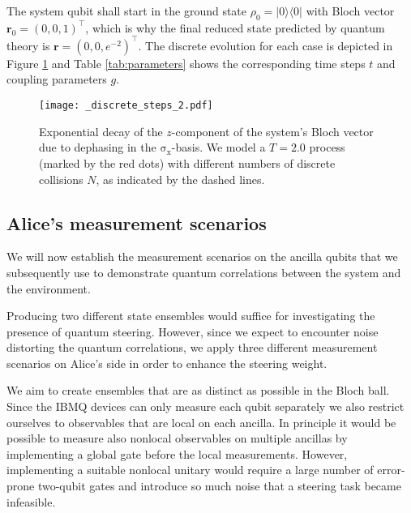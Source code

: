 \documentclass[aps,pra,twocolumn,superscriptaddress,showemail,showpacs,longbibliography]{revtex4-2}
\newcommand{\kb}[2]{|#1\rangle\langle#2|} %
\newcommand{\sigmax}{\operatorname{\sigma_x}}
\renewcommand{\vec}{\mathbf}
\begin{document}
The system qubit shall start in the ground state $\rho_0 = \kb{0}{0}$ with Bloch vector $\vec{r}_0 = (0,0,1)^\intercal$, which is why the final reduced state predicted by quantum theory is $\vec{r} = (0,0,e^{-2})^\intercal$. The discrete evolution for each case is depicted in Figure \ref{fig:collisions} and Table \ref{tab:parameters} shows the corresponding time steps $t$ and coupling parameters $g$.
\begin{figure}
    \centering
    \texttt{[image: \_discrete\_steps\_2.pdf]}
    \caption{Exponential decay of the $z$-component of the system's Bloch vector due to dephasing in the $\sigmax$-basis. We model a $T=2.0$ process (marked by the red dots) with different numbers of discrete collisions $N$, as indicated by the dashed lines.}
    \label{fig:collisions}
\end{figure}

\subsection{Alice's measurement scenarios}
\label{sub:strats}
We will now establish the measurement scenarios on the ancilla qubits that we subsequently use to demonstrate quantum correlations between the system and the environment.

Producing two different state ensembles would suffice for investigating the presence of quantum steering. However, since we expect to encounter noise distorting the quantum correlations, we apply three different measurement scenarios on Alice's side in order to enhance the steering weight.

We aim to create ensembles that are as distinct as possible in the Bloch ball. Since the IBMQ devices can only measure each qubit separately we also restrict ourselves to observables that are local on each ancilla. In principle it would be possible to measure also nonlocal observables on multiple ancillas by implementing a global gate before the local measurements. However, implementing a suitable nonlocal unitary would require a large number of error-prone two-qubit gates and introduce so much noise that a steering task became infeasible.
\end{document}
